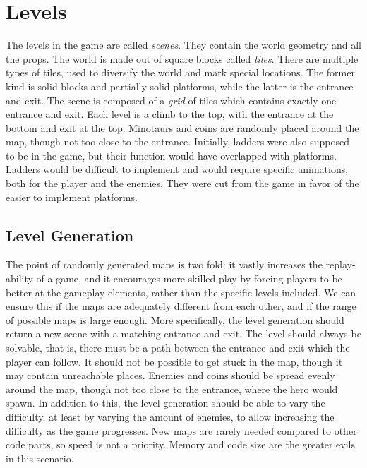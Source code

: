 \section{Levels} %
The levels in the game are called \emph{scenes}. They contain the world geometry and all the props. The world is made out of square blocks called \emph{tiles}. There are multiple types of tiles, used to diversify the world and mark special locations. The former kind is solid blocks and partially solid platforms, while the latter is the entrance and exit. The scene is composed of a \emph{grid} of tiles which contains exactly one entrance and exit. Each level is a climb to the top, with the entrance at the bottom and exit at the top. Minotaurs and coins are randomly placed around the map, though not too close to the entrance.
\newline
Initially, ladders were also supposed to be in the game, but their function would have overlapped with platforms. Ladders would be difficult to implement and would require specific animations, both for the player and the enemies. They were cut from the game in favor of the easier to implement platforms.

\subsection*{Level Generation} %
The point of randomly generated maps is two fold: it vastly increases the replay-ability of a game, and it encourages more skilled play by forcing players to be better at the gameplay elements, rather than the specific levels included. We can ensure this if the maps are adequately different from each other, and if the range of possible maps is large enough. %
\newline
More specifically, the level generation should return a new scene with a matching entrance and exit. The level should always be solvable, that is, there must be a path between the entrance and exit which the player can follow. It should not be possible to get stuck in the map, though it may contain unreachable places. Enemies and coins should be spread evenly around the map, though not too close to the entrance, where the hero would spawn. In addition to this, the level generation should be able to vary the difficulty, at least by varying the amount of enemies, to allow increasing the difficulty as the game progresses. %
\newline
New maps are rarely needed compared to other code parts, so speed is not a priority. Memory and code size are the greater evils in this scenario.

